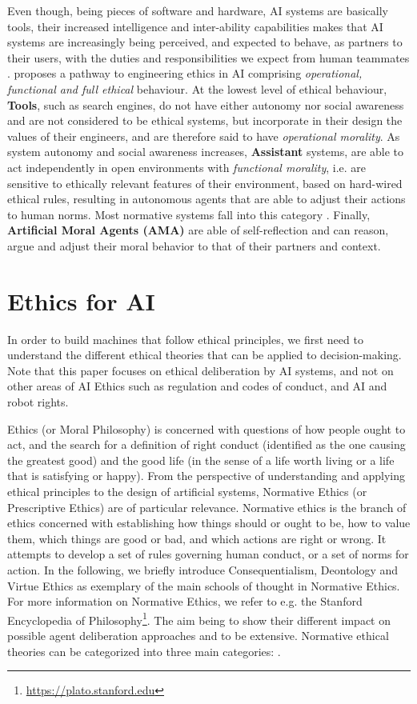 \documentclass[twocolumn]{article}
\begin{document}
Even though, being pieces of software and hardware, AI systems are basically tools, their increased intelligence and inter-ability capabilities makes that AI systems are increasingly being perceived, and expected to behave, as partners to their users, with the duties and responsibilities we expect from human teammates \cite{casa12}. 
\cite{wallach2008moral} proposes a pathway to engineering ethics in AI comprising \textit{operational, functional and full ethical} behaviour.  At the lowest level of ethical behaviour, \textbf{Tools}, such as search engines, do not have either autonomy nor social awareness and are not considered to be ethical systems, but incorporate in their design the values of their engineers, and are therefore said to have \textit{operational morality}. As system autonomy and social awareness increases, \textbf{Assistant} systems, are able to act independently in open environments with \textit{functional morality}, i.e. are sensitive to ethically relevant features of their environment, based on hard-wired ethical rules, resulting in autonomous agents that are able to adjust their actions to human norms. Most normative systems fall into this category \cite{conte1998autonomous,boella2006introduction}. Finally, \textbf{Artificial Moral Agents (AMA)} are able of self-reflection and can reason, argue and adjust their moral behavior to that of their partners and context. %

\section{Ethics for AI}\label{sec:ethics}
In order to build machines that follow ethical principles, we first need to understand the different ethical theories that can be applied to decision-making. Note that this paper  focuses on ethical deliberation by AI systems, and not on other areas of AI Ethics such as regulation and codes of conduct, and AI and robot rights.




Ethics (or Moral Philosophy) is concerned with questions of how people ought to act, and the search for a definition of right conduct (identified as the one causing the greatest good) and the good life (in the sense of a life worth living or a life that is satisfying or happy). From the perspective of understanding and applying ethical principles to the design of artificial systems, Normative Ethics (or Prescriptive Ethics) are of particular relevance. Normative ethics is the branch of ethics concerned with establishing how things should or ought to be, how to value them, which things are good or bad, and which actions are right or wrong. It attempts to develop a set of rules governing human conduct, or a set of norms for action. 
In the following, we briefly  introduce Consequentialism, Deontology and Virtue Ethics as exemplary of the main schools of thought in Normative Ethics. For more information on Normative Ethics, we refer to e.g. the Stanford Encyclopedia of Philosophy\footnote{\url{https://plato.stanford.edu}}.
The aim being to show their different impact on possible agent deliberation approaches and to be extensive. %
Normative ethical theories can be categorized into three main categories: .  %
\end{document}
